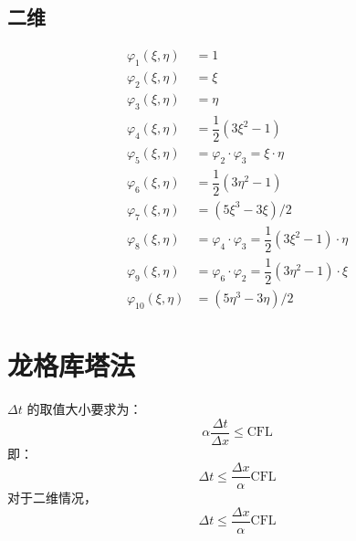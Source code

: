 \documentclass{article}
\numberwithin{equation}{subsection}    %
\begin{document}
\begin{appendix}
    \subsection{二维}
    \begin{equation}
        \begin{aligned}
            \varphi_{1}(\xi, \eta)  & =1                                                                             \\
            \varphi_{2}(\xi, \eta)  & =\xi                                                                           \\
            \varphi_{3}(\xi, \eta)  & =\eta                                                                          \\
            \varphi_{4}(\xi, \eta)  & =\dfrac{1}{2}\left(3 \xi^{2}-1\right)                                          \\
            \varphi_{5}(\xi, \eta)  & =\varphi_{2} \cdot \varphi_{3}=\xi \cdot \eta                                  \\
            \varphi_{6}(\xi, \eta)  & =\dfrac{1}{2}\left(3 \eta^{2}-1\right)                                         \\
            \varphi_{7}(\xi, \eta)  & =\left(5 \xi^{3}-3 \xi\right) / 2                                              \\
            \varphi_{8}(\xi, \eta)  & =\varphi_{4} \cdot \varphi_{3}=\dfrac{1}{2}\left(3 \xi^{2}-1\right) \cdot \eta \\
            \varphi_{9}(\xi, \eta)  & =\varphi_{6} \cdot \varphi_{2}=\dfrac{1}{2}\left(3 \eta^{2}-1\right) \cdot \xi \\
            \varphi_{10}(\xi, \eta) & =\left(5 \eta^{3}-3 \eta\right) / 2
        \end{aligned}
    \end{equation}
    \section{龙格库塔法}
    $\Delta t$ 的取值大小要求为：\cite{RN109}
    \begin{equation}
        \alpha \frac{\Delta t}{\Delta x} \leq \text{CFL}
    \end{equation}
    即：
    \begin{equation}
        \Delta t \leqslant \frac{\Delta x}{\alpha}\text{CFL}
    \end{equation}
    对于二维情况，
    \begin{equation}
        \Delta t \leqslant \frac{\Delta x}{\alpha}\text{CFL}
    \end{equation}


\end{appendix}
\end{document}
